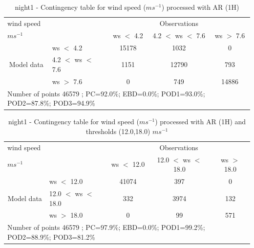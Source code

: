 \begin{table}[h!]
\begin{center}
\begin{tabular}{llccc}
\hline
{wind speed}                                       &                                                    & \multicolumn{3}{c}{Observations}                 \\
{$m s^{-1}$}                                       &                             & ws $<$ 4.2   & 4.2 $<$ ws $<$ 7.6 & ws $>$ 7.6 \\
\hline
\multicolumn{1}{c}{\multirow{3}{*}{Model data}}  & ws $<$ 4.2             & 15178                & 1032                       & 0              \\
                                                 & 4.2  $<$ ws $<$ 7.6 & 1151                & 12790                       & 793              \\
                                                 & ws $>$ 7.6             & 0                & 749                       & 14886              \\
\hline 
\multicolumn{5}{l}{ Number of points        46579 ; PC=92.0\%; EBD=0.0\%; POD1=93.0\%; POD2=87.8\%; POD3=94.9\%}                 \\
\end{tabular}
\end{center}
\caption{night1 - Contingency table for  wind speed ($m s^{-1}$) processed with AR (1H)}
\label{tab:contingencywsAFT:night1}
\end{table}
\begin{table}[h!]
\begin{center}
\begin{tabular}{llccc}
\hline
{wind speed}                                       &                                                    & \multicolumn{3}{c}{Observations}                 \\
{$m s^{-1}$}                                       &                             & ws $<$ 12.0   & 12.0 $<$ ws $<$ 18.0 & ws $>$ 18.0 \\
\hline
\multicolumn{1}{c}{\multirow{3}{*}{Model data}}  & ws $<$ 12.0             & 41074                & 397                       & 0              \\
                                                 & 12.0  $<$ ws $<$ 18.0 & 332                & 3974                       & 132              \\
                                                 & ws $>$ 18.0             & 0                & 99                       & 571              \\
\hline 
\multicolumn{5}{l}{ Number of points        46579 ; PC=97.9\%; EBD=0.0\%; POD1=99.2\%; POD2=88.9\%; POD3=81.2\%}                 \\
\end{tabular}
\end{center}
\caption{night1 - Contingency table for  wind speed ($m s^{-1}$) processed with AR (1H) and thresholds (12.0,18.0) $m s^{-1}$}
\label{tab:contingencywsAFT:night1}
\end{table}
